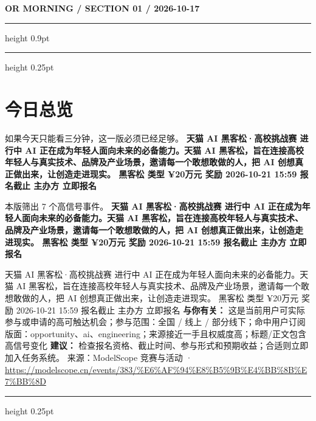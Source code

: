 \documentclass[10.5pt]{ctexart}
\begin{document}
{\small\bfseries OR MORNING / SECTION 01 / 2026-10-17}
\vspace{2mm}
\hrule height 0.9pt
\vspace{1.5mm}
\hrule height 0.25pt
\vspace{4mm}
\section*{今日总览}
{\color{ormuted} 如果今天只能看三分钟，这一版必须已经足够。}
\vspace{2mm}
{\fontsize{25}{29}\selectfont\bfseries 天猫 AI 黑客松·高校挑战赛 进行中 AI 正在成为年轻人面向未来的必备能力。天猫 AI 黑客松，旨在连接高校年轻人与真实技术、品牌及产业场景，邀请每一个敢想敢做的人，把 AI 创想真正做出来，让创造走进现实。 黑客松 类型 ¥20万元 奖励 2026-10-21 15:59 报名截止 主办方 立即报名}\par
\vspace{2mm}
{\large 本版筛出 7 个高信号事件。}
\vspace{3mm}
{\Large\bfseries 天猫 AI 黑客松·高校挑战赛 进行中 AI 正在成为年轻人面向未来的必备能力。天猫 AI 黑客松，旨在连接高校年轻人与真实技术、品牌及产业场景，邀请每一个敢想敢做的人，把 AI 创想真正做出来，让创造走进现实。 黑客松 类型 ¥20万元 奖励 2026-10-21 15:59 报名截止 主办方 立即报名}\par
天猫 AI 黑客松·高校挑战赛 进行中 AI 正在成为年轻人面向未来的必备能力。天猫 AI 黑客松，旨在连接高校年轻人与真实技术、品牌及产业场景，邀请每一个敢想敢做的人，把 AI 创想真正做出来，让创造走进现实。 黑客松 类型 ¥20万元 奖励 2026-10-21 15:59 报名截止 主办方 立即报名
\textbf{与你有关：} 这是当前用户可实际参与或申请的高可触达机会；参与范围：全国 / 线上 / 部分线下；命中用户订阅版面：opportunity、ai、engineering；来源接近一手且权威度高；标题/正文包含高信号变化
\textbf{建议：} 检查报名资格、截止时间、参与形式和预期收益；合适则立即加入任务系统。
{\footnotesize\color{ormuted} 来源：ModelScope 竞赛与活动 · \url{https://modelscope.cn/events/383/%E6%AF%94%E8%B5%9B%E4%BB%8B%E7%BB%8D}}
\vspace{3mm}
\hrule height 0.25pt
\vspace{3mm}
\end{document}
